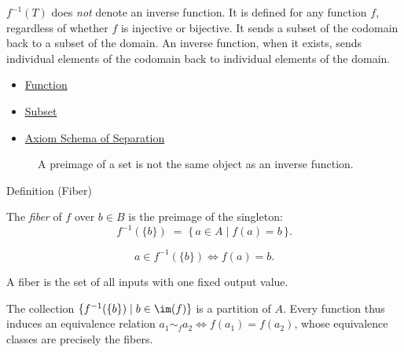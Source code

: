 \begin{remark*}[Exposition]
$f^{-1}(T)$ does \emph{not} denote an inverse function. It is defined for any
function $f$, regardless of whether $f$ is injective or bijective.
It sends a subset of the codomain back to a subset of the domain. An inverse
function, when it exists, sends individual elements of the codomain back to
individual elements of the domain.
\end{remark*}

\begin{dependencies}
\begin{itemize}
  \item \hyperref[def:function]{Function}
  \item \hyperref[def:subset]{Subset}
  \item \hyperref[ax:separation]{Axiom Schema of Separation}
\end{itemize}
\end{dependencies}

\begin{figure}[htbp]
\centering

\caption{A preimage of a set is not the same object as an inverse function.}
\label{fig:preimage-vs-inverse}
\end{figure}

\begin{definitionbox}{Definition (Fiber)}
\begin{definition}[Fiber]\label{def:fiber}
The \emph{fiber} of $f$ over $b \in B$ is the preimage of the singleton:
\[
f^{-1}(\{b\}) \;=\; \{\, a \in A \mid f(a) = b \,\}.
\]
\end{definition}
\end{definitionbox}

\begin{remark*}
\[
  a\in f^{-1}(\{b\})
  \iff
  f(a)=b.
\]
\end{remark*}

\begin{remark*}[Interpretation]
A fiber is the set of all inputs with one fixed output value.
\end{remark*}

\begin{remark*}[Exposition]
The collection $\{f^{-1}(\{b\}) \mid b \in \im(f)\}$ is a partition of $A$.
Every function thus induces an equivalence relation $a_1 \sim_f a_2 \iff f(a_1) = f(a_2)$,
whose equivalence classes are precisely the fibers.
\end{remark*}

